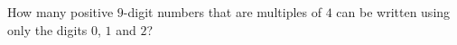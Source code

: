 How many positive $9$-digit numbers that are multiples of $4$ can be written using only the digits $0$, $1$ and $2$?
